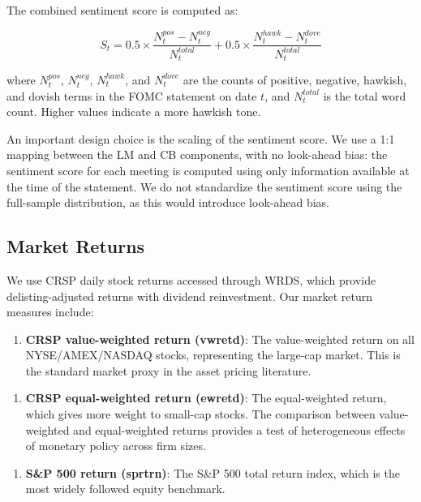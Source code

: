 \documentclass[12pt]{article}
\begin{document}
The combined sentiment score is computed as:

\begin{equation*}
S_t = 0.5 \times \frac{N^{pos}_t - N^{neg}_t}{N^{total}_t} + 0.5 \times \frac{N^{hawk}_t - N^{dove}_t}{N^{total}_t}
\end{equation*}

where $N^{pos}_t$, $N^{neg}_t$, $N^{hawk}_t$, and $N^{dove}_t$ are the counts of positive, negative, hawkish, and dovish terms in the FOMC statement on date $t$, and $N^{total}_t$ is the total word count. Higher values indicate a more hawkish tone.

An important design choice is the scaling of the sentiment score. We use a 1:1 mapping between the LM and CB components, with no look-ahead bias: the sentiment score for each meeting is computed using only information available at the time of the statement. We do not standardize the sentiment score using the full-sample distribution, as this would introduce look-ahead bias.

\subsection{Market Returns}

We use CRSP daily stock returns accessed through WRDS, which provide delisting-adjusted returns with dividend reinvestment. Our market return measures include:

\begin{enumerate}
\item \textbf{CRSP value-weighted return (vwretd)}: The value-weighted return on all NYSE/AMEX/NASDAQ stocks, representing the large-cap market. This is the standard market proxy in the asset pricing literature.
\end{enumerate}

\begin{enumerate}
\item \textbf{CRSP equal-weighted return (ewretd)}: The equal-weighted return, which gives more weight to small-cap stocks. The comparison between value-weighted and equal-weighted returns provides a test of heterogeneous effects of monetary policy across firm sizes.
\end{enumerate}

\begin{enumerate}
\item \textbf{S\&P 500 return (sprtrn)}: The S\&P 500 total return index, which is the most widely followed equity benchmark.
\end{enumerate}
\end{document}

